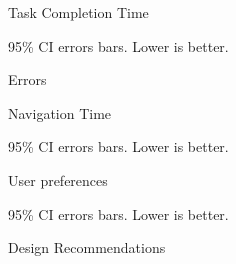 \begin{frame}{Task Completion Time}
  \begin{flushright}
    \scriptsize 95\% CI errors bars. Lower is better.
  \end{flushright}
\end{frame}

\begin{frame}{Errors}
\end{frame}

\begin{frame}{Navigation Time}
  \begin{flushright}
    \scriptsize 95\% CI errors bars. Lower is better.
  \end{flushright}
\end{frame}

\begin{frame}{User preferences}
  \begin{flushright}
    \scriptsize 95\% CI errors bars. Lower is better.
  \end{flushright}
\end{frame}

\begin{frame}{Design Recommendations}
\end{frame}